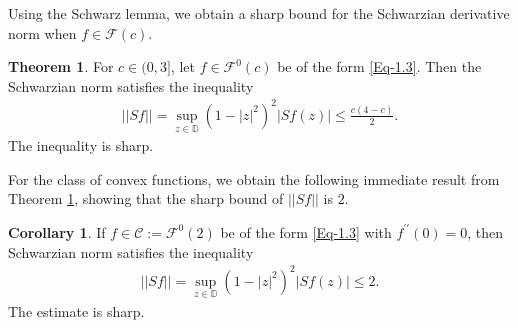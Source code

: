 \documentclass[a4paper,12pt]{amsart}
\theoremstyle{plain}
\theoremstyle{definition}
\newtheorem{cor}{Corollary}[section]
\newtheorem{thm}{Theorem}[section]
\theoremstyle{plain}
\begin{document}
Using the Schwarz lemma, we obtain a sharp bound for the Schwarzian derivative norm when \( f \in \mathcal{F}(c) \).
\begin{thm}\label{Th-2.4}
	For $c\in(0,3]$, let $f\in\mathcal{F}^0(c)$ be of the form \eqref{Eq-1.3}. Then the Schwarzian norm satisfies the inequality
	\begin{align*}
		||Sf||=\sup_{z\in\mathbb{D}}(1-|z|^2)^2|Sf(z)|\leq\frac{c(4-c)}{2}.
	\end{align*}
	The inequality is sharp. 
\end{thm}
	For the class of convex functions, we obtain the following immediate result from Theorem \ref{Th-2.4}, showing that the sharp bound of $||Sf||$ is $2$.
	\begin{cor}
		If $f\in \mathcal{C} := \mathcal{F}^0(2)$ be of the form \eqref{Eq-1.3} with $f^{\prime\prime}(0)=0$, then Schwarzian norm satisfies the inequality
		\begin{align*}
			||Sf||=\sup_{z\in\mathbb{D}}(1-|z|^2)^2|Sf(z)|\leq2.
		\end{align*}
		The estimate is sharp.
		
	\end{cor}
\end{document}
